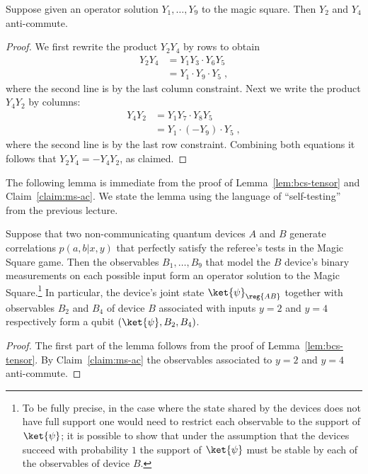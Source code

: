 \begin{claim}\label{claim:ms-ac}
Suppose given an operator solution $Y_1,\ldots,Y_9$ to the magic square. Then $Y_2$ and $Y_4$ anti-commute. 
\end{claim}

\begin{proof}
We first rewrite the product $Y_2Y_4$ by rows to obtain 
\begin{align*}
Y_2 Y_4 &= Y_1 Y_3\cdot   Y_6 Y_5 \\
&= Y_1 \cdot Y_9 \cdot Y_5\;,
\end{align*}
where the second line is by the last column constraint. Next we write the product $Y_4 Y_2$ by columns: 
\begin{align*}
Y_4 Y_2 &=  Y_1 Y_7 \cdot Y_8 Y_5  \\
&= Y_1 \cdot (-Y_9) \cdot Y_5 \;,
\end{align*}
where the second line is by the last row constraint. Combining both equations it follows that $Y_2 Y_4 = -Y_4 Y_2$, as claimed. 
\end{proof}

The following lemma is immediate from the proof of Lemma~\ref{lem:bcs-tensor} and Claim~\ref{claim:ms-ac}. We state the lemma using the language of ``self-testing'' from the previous lecture. 

\begin{lemma}\label{lem:ms-perfect}
Suppose that two non-communicating quantum devices $A$ and $B$ generate correlations $p(a,b|x,y)$ that perfectly satisfy the referee's tests in the Magic Square game. Then the observables $B_1,\ldots,B_9$ that model the $B$ device's binary measurements on each possible input form an operator solution to the Magic Square.\footnote{To be fully precise, in the case where the state shared by the devices does not have full support one would need to restrict each observable to the support of $\ket{\psi}$; it is possible to show that under the assumption that the devices succeed with probability $1$ the support of $\ket{\psi}$ must be stable by each of the observables of device $B$.}
In particular, the device's joint state $\ket{\psi}_\reg{AB}$ together with observables $B_2$ and $B_4$ of device $B$ associated with inputs $y=2$ and $y=4$ respectively form a qubit $(\ket{\psi},B_2,B_4)$. 
\end{lemma}

\begin{proof}
The first part of the lemma follows from the proof of Lemma~\ref{lem:bcs-tensor}. By Claim~\ref{claim:ms-ac} the observables associated to $y=2$ and $y=4$ anti-commute. 
\end{proof}

